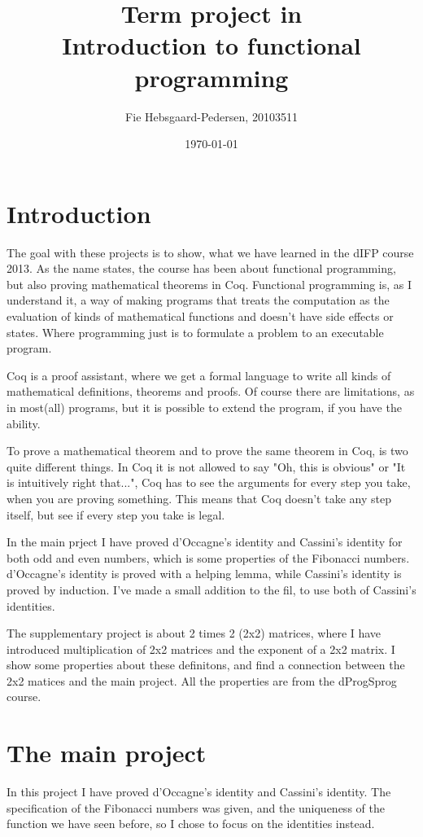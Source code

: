\documentclass[a4paper,10p,danish]{article}
\begin{document}
\title{Term project in\\ Introduction to functional programming}
\date{\today}
\author{Fie Hebsgaard-Pedersen, 20103511}
\maketitle
\thispagestyle{empty}
\section{Introduction}
The goal with these projects is to show, what we have learned in the dIFP course 2013. As the name states, the course has been about functional programming, but also proving mathematical theorems in Coq. Functional programming is, as I understand it, a way of making programs that treats the computation as the evaluation of kinds of mathematical functions and doesn't have side effects or states. Where programming just is to formulate a problem to an executable program. 

Coq is a proof assistant, where we get a formal language to write all kinds of mathematical definitions, theorems and proofs. Of course there are limitations, as in most(all) programs, but it is possible to extend the program, if you have the ability. 

To prove a mathematical theorem and to prove the same theorem in Coq, is two quite different things. In Coq it is not allowed to say "Oh, this is obvious" or "It is intuitively right that...", Coq has to see the arguments for every step you take, when you are proving something. This means that Coq doesn't take any step itself, but see if every step you take is legal.

In the main prject I have proved d'Occagne's identity and Cassini's identity for both odd and even numbers, which is some properties of the Fibonacci numbers. d'Occagne's identity is proved with a helping lemma, while Cassini's identity is proved by induction. I've made a small addition to the fil, to use both of Cassini's identities. 

The supplementary project is about 2 times 2 (2x2) matrices, where I have introduced multiplication of 2x2 matrices and the exponent of a 2x2 matrix. I show some properties about these definitons, and find a connection between the 2x2 matices and the main project. All the properties are from the dProgSprog course.

\section{The main project}
In this project I have proved d'Occagne's identity and Cassini's identity. The specification of the Fibonacci numbers was given, and the uniqueness of the function we have seen before, so I chose to focus on the identities instead.
\end{document}

